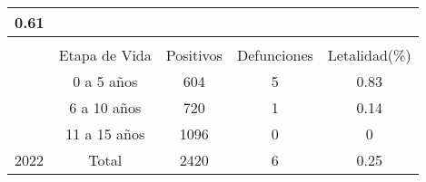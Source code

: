 \begin{tabular}{lcccc}
		\multicolumn{1}{c|}{\cellcolor[HTML]{ECF4FF}0.61} \\ \hline
		&
		\multicolumn{1}{l}{} &
		\multicolumn{1}{l}{} &
		\multicolumn{1}{l}{} &
		\multicolumn{1}{l}{} \\ \cline{2-5} 
		\multicolumn{1}{l|}{} &
		\multicolumn{1}{c|}{\cellcolor[HTML]{ECF4FF}Etapa de Vida} &
		\multicolumn{1}{c|}{\cellcolor[HTML]{ECF4FF}Positivos} &
		\multicolumn{1}{c|}{\cellcolor[HTML]{ECF4FF}Defunciones} &
		\multicolumn{1}{c|}{\cellcolor[HTML]{ECF4FF}Letalidad(\%)} \\ \hline
		\multicolumn{1}{|l|}{} &
		\multicolumn{1}{c|}{0 a 5 años} &
		\multicolumn{1}{c|}{604} &
		\multicolumn{1}{c|}{5} &
		\multicolumn{1}{c|}{0.83} \\ \cline{2-5} 
		\multicolumn{1}{|l|}{} &
		\multicolumn{1}{c|}{6 a 10 años} &
		\multicolumn{1}{c|}{720} &
		\multicolumn{1}{c|}{1} &
		\multicolumn{1}{c|}{0.14} \\ \cline{2-5} 
		\multicolumn{1}{|l|}{} &
		\multicolumn{1}{c|}{11 a 15 años} &
		\multicolumn{1}{c|}{1096} &
		\multicolumn{1}{c|}{0} &
		\multicolumn{1}{c|}{0} \\ \cline{2-5} 
		\multicolumn{1}{|l|}{\multirow{-4}{*}{2022}} &
		\multicolumn{1}{c|}{\cellcolor[HTML]{ECF4FF}Total} &
		\multicolumn{1}{c|}{\cellcolor[HTML]{ECF4FF}2420} &
		\multicolumn{1}{c|}{\cellcolor[HTML]{ECF4FF}6} &
		\multicolumn{1}{c|}{\cellcolor[HTML]{ECF4FF}0.25} \\ \hline
	\end{tabular}